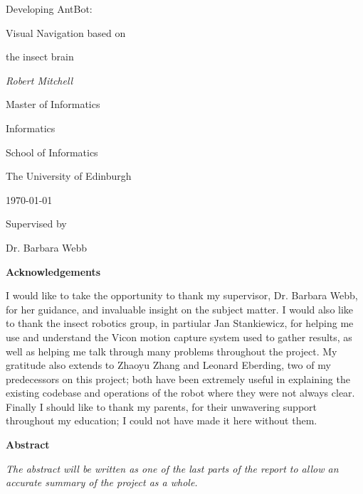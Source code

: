 \documentclass[a4paper,12pt,twoside,openright]{article}
\begin{document}
\centering
\vspace*{6cm}
{\huge Developing AntBot: \par Visual Navigation based on \par the insect brain \par}
\vspace{1cm}
{\Large \textit{Robert Mitchell}}

\vspace{3cm}

{\large Master of Informatics \par}
{\large Informatics \par}
{\large School of Informatics \par}
{\large The University of Edinburgh \par}
\large \today \par

\vfill
Supervised by\par
Dr. Barbara Webb

\newpage

\centering
{\LARGE \textbf{Acknowledgements}}
\begin{flushleft}
 {\small
  I would like to take the opportunity to thank my supervisor, Dr. Barbara Webb, for her
  guidance, and invaluable insight on the subject matter. I would also like to thank the
  insect robotics group, in partiular Jan Stankiewicz, for helping me use and understand the
  Vicon motion capture system used to gather results, as well as helping me talk through many
  problems throughout the project. My gratitude also extends to
  Zhaoyu Zhang and Leonard Eberding, two of my predecessors on this project; both have been
  extremely useful in explaining the existing codebase and operations of the robot where they
  were not always clear. Finally I should like to thank my parents, for their unwavering support
  throughout my education; I could not have made it here without them. }
\end{flushleft}  

\newpage
\centering
{\LARGE\textbf{Abstract}}
\begin{flushleft}
  {\small \textit{The abstract will be written as one of the last parts of the report to allow
    an accurate summary of the project as a whole.}}
\end{flushleft}
\end{document}
